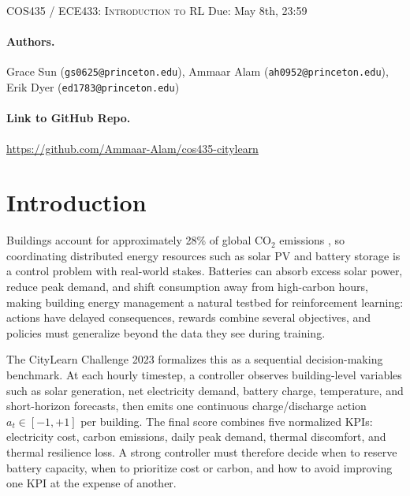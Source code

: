 \documentclass{article}
\author{}
\begin{document}
\newcommand{\lectureTitle}{Generalizable RL for Neighborhood Battery Control in CityLearn}
\newcommand{\lectureDate}{Due: May 8th, 23:59}

\textsc{COS435 / ECE433: Introduction to RL}
\vspace{1em} \hfill \lectureDate

\maketitle
\setlength{\headheight}{28pt}

\paragraph{Authors.} Grace Sun (\texttt{gs0625@princeton.edu}), Ammaar Alam (\texttt{ah0952@princeton.edu}), Erik Dyer (\texttt{ed1783@princeton.edu})

\paragraph{Link to GitHub Repo.} \url{https://github.com/Ammaar-Alam/cos435-citylearn}

\section{Introduction}

Buildings account for approximately 28\% of global CO$_2$ emissions \citep{iea2022buildings}, so coordinating distributed energy resources such as solar PV and battery storage is a control problem with real-world stakes. Batteries can absorb excess solar power, reduce peak demand, and shift consumption away from high-carbon hours, making building energy management a natural testbed for reinforcement learning: actions have delayed consequences, rewards combine several objectives, and policies must generalize beyond the data they see during training.

The CityLearn Challenge 2023 \citep{citylearn2023} formalizes this as a sequential decision-making benchmark. At each hourly timestep, a controller observes building-level variables such as solar generation, net electricity demand, battery charge, temperature, and short-horizon forecasts, then emits one continuous charge/discharge action $a_t \in [-1,+1]$ per building. The final score combines five normalized KPIs: electricity cost, carbon emissions, daily peak demand, thermal discomfort, and thermal resilience loss. A strong controller must therefore decide when to reserve battery capacity, when to prioritize cost or carbon, and how to avoid improving one KPI at the expense of another.
\end{document}

